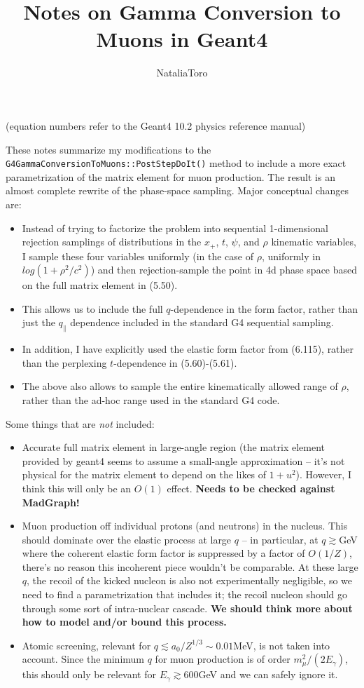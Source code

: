 \documentclass[11pt]{article}
\title{Notes on Gamma Conversion to Muons in Geant4}
\author{NataliaToro}
\date{}                               %
\begin{document}
\maketitle

(equation numbers refer to the Geant4 10.2 physics reference manual)

These notes summarize my modifications to the \verb=G4GammaConversionToMuons::PostStepDoIt()= method to include a more exact parametrization of the matrix element for muon production.  The result is an almost complete rewrite of the phase-space sampling.  Major  conceptual changes are:
\begin{itemize}
\item Instead of trying to factorize the problem into sequential 1-dimensional rejection samplings of distributions in the $x_+$, $t$, $\psi$, and $\rho$ kinematic variables, I sample these four variables uniformly (in the case of $\rho$, uniformly in $log(1+\rho^2/c^2)$) and then rejection-sample the point in 4d phase space based on the full matrix element in (5.50).  
\item This allows us to include the full $q$-dependence in the form factor, rather than just the $q_\parallel$ dependence included in the standard G4 sequential sampling.
\item In addition, I have explicitly used the elastic form factor from (6.115), rather than the perplexing $t$-dependence in (5.60)-(5.61).  
\item The above also allows to sample the entire kinematically allowed range of $\rho$, rather than the ad-hoc range used in the standard G4 code.
\end{itemize}
Some things that are \emph{not} included:
\begin{itemize}
\item Accurate full matrix element in large-angle region (the matrix element provided by geant4 seems to assume a small-angle approximation -- it's not physical for the matrix element to depend on the likes of $1+u^2$).   However, I think this will only be an $O(1)$ effect.  \textbf{Needs to be checked against MadGraph!}
\item Muon production off individual protons (and neutrons) in the nucleus.  This should dominate over the elastic process at large $q$ -- in particular, at $q\gtrsim $GeV where the coherent elastic form factor is suppressed by a factor of $O(1/Z)$, there's no reason this incoherent piece wouldn't be comparable.  At these large $q$, the recoil of the kicked nucleon is also not experimentally negligible, so we need to find a parametrization that includes it; the recoil nucleon should go through some sort of intra-nuclear cascade.  \textbf{We should think more about how to model and/or bound this process. }
\item Atomic screening, relevant for $q \lesssim a_0/Z^{1/3} \sim 0.01 $MeV, is not taken into account.  Since the minimum $q$ for muon production is of order $m_\mu^2/(2E_\gamma)$, this should only be relevant for $E_\gamma \gtrsim 600 $GeV and we can safely ignore it. 
\end{itemize}
\end{document}
